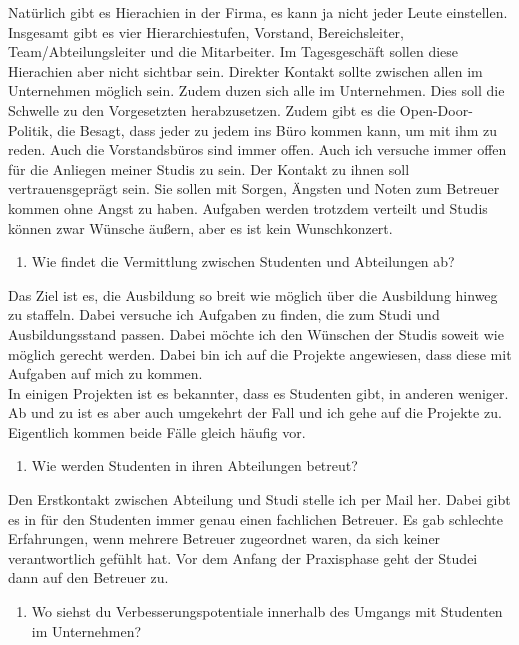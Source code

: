 \documentclass[
  12pt,
  ngerman,
  a4paper,
]{article}
\providecommand{\tightlist}{%
  \setlength{\itemsep}{0pt}\setlength{\parskip}{0pt}}
\begin{document}
Natürlich gibt es Hierachien in der Firma, es kann ja nicht jeder Leute
einstellen. Insgesamt gibt es vier Hierarchiestufen, Vorstand,
Bereichsleiter, Team/Abteilungsleiter und die Mitarbeiter. Im
Tagesgeschäft sollen diese Hierachien aber nicht sichtbar sein. Direkter
Kontakt sollte zwischen allen im Unternehmen möglich sein. Zudem duzen
sich alle im Unternehmen. Dies soll die Schwelle zu den Vorgesetzten
herabzusetzen. Zudem gibt es die Open-Door-Politik, die Besagt, dass
jeder zu jedem ins Büro kommen kann, um mit ihm zu reden. Auch die
Vorstandsbüros sind immer offen. Auch ich versuche immer offen für die
Anliegen meiner Studis zu sein. Der Kontakt zu ihnen soll
vertrauensgeprägt sein. Sie sollen mit Sorgen, Ängsten und Noten zum
Betreuer kommen ohne Angst zu haben. Aufgaben werden trotzdem verteilt
und Studis können zwar Wünsche äußern, aber es ist kein Wunschkonzert.

\begin{enumerate}
\def\labelenumi{\arabic{enumi}.}
\setcounter{enumi}{4}
\tightlist
\item
  Wie findet die Vermittlung zwischen Studenten und Abteilungen ab?
\end{enumerate}

Das Ziel ist es, die Ausbildung so breit wie möglich über die Ausbildung
hinweg zu staffeln. Dabei versuche ich Aufgaben zu finden, die zum Studi
und Ausbildungsstand passen. Dabei möchte ich den Wünschen der Studis
soweit wie möglich gerecht werden. Dabei bin ich auf die Projekte
angewiesen, dass diese mit Aufgaben auf mich zu kommen.\\
In einigen Projekten ist es bekannter, dass es Studenten gibt, in
anderen weniger. Ab und zu ist es aber auch umgekehrt der Fall und ich
gehe auf die Projekte zu. Eigentlich kommen beide Fälle gleich häufig
vor.

\begin{enumerate}
\def\labelenumi{\arabic{enumi}.}
\setcounter{enumi}{5}
\tightlist
\item
  Wie werden Studenten in ihren Abteilungen betreut?
\end{enumerate}

Den Erstkontakt zwischen Abteilung und Studi stelle ich per Mail her.
Dabei gibt es in für den Studenten immer genau einen fachlichen
Betreuer. Es gab schlechte Erfahrungen, wenn mehrere Betreuer zugeordnet
waren, da sich keiner verantwortlich gefühlt hat. Vor dem Anfang der
Praxisphase geht der Studei dann auf den Betreuer zu.

\begin{enumerate}
\def\labelenumi{\arabic{enumi}.}
\setcounter{enumi}{6}
\tightlist
\item
  Wo siehst du Verbesserungspotentiale innerhalb des Umgangs mit
  Studenten im Unternehmen?
\end{enumerate}
\end{document}
